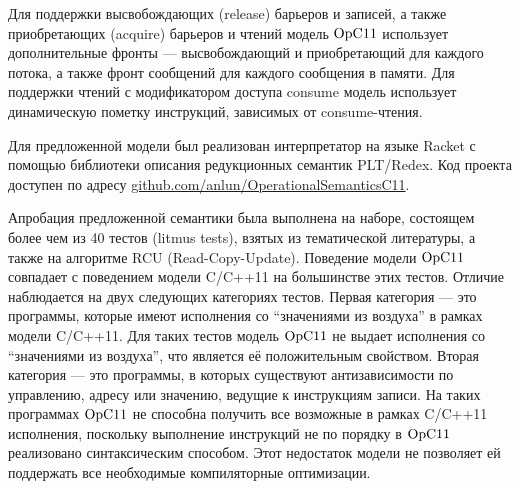 Для поддержки высвобождающих (release) барьеров и записей, а также приобретающих (acquire) барьеров и чтений
модель $\mathrm{OpC11}$ использует дополнительные фронты --- высвобождающий и приобретающий для каждого потока,
а также фронт сообщений для каждого сообщения в памяти. Для поддержки чтений с модификатором доступа
consume модель использует динамическую пометку инструкций, зависимых от consume-чтения.


Для предложенной модели был реализован интерпретатор на языке Racket с помощью библиотеки описания редукционных
семантик PLT/Redex. Код проекта доступен по адресу \url{github.com/anlun/OperationalSemanticsC11}.

Апробация предложенной семантики была выполнена на наборе, состоящем более чем из 40 тестов (litmus tests), взятых из  тематической литературы, а также 
на алгоритме RCU (Read-Copy-Update). Поведение модели $\mathrm{OpC11}$ совпадает с поведением модели C/C++11 на большинстве этих тестов.
Отличие наблюдается на двух следующих категориях тестов. Первая категория --- это программы, которые имеют исполнения со
``значениями из воздуха'' в рамках модели C/C++11. Для таких тестов модель $\mathrm{OpC11}$ не выдает исполнения со ``значениями из воздуха'',
что является её положительным свойством. Вторая категория --- это программы, в которых существуют антизависимости по управлению,
адресу или значению, ведущие к инструкциям записи. На таких программах $\mathrm{OpC11}$ не способна получить все возможные в рамках C/C++11
исполнения, поскольку выполнение инструкций не по порядку в $\mathrm{OpC11}$ реализовано синтаксическим способом. Этот недостаток модели не позволяет ей поддержать все необходимые компиляторные оптимизации.

